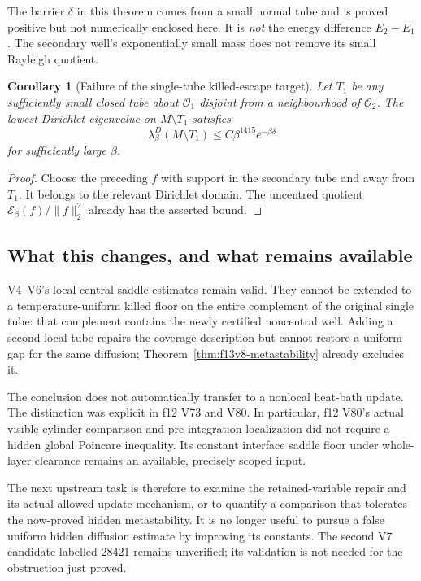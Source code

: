 \documentclass[11pt,oneside]{article}
\newtheorem{corollary}[theorem]{Corollary}
\newcommand{\E}{\mathcal E}
\begin{document}
The barrier \(\delta\) in this theorem
comes from a small normal tube and is
proved positive but not numerically
enclosed here. It is \emph{not} the
energy difference \(E_2-E_1\). The
secondary well's exponentially small
mass does not remove its small
Rayleigh quotient.

\begin{corollary}[Failure of the single-tube killed-escape target]
\label{cor:f13v8-killed}
Let \(T_1\) be any sufficiently small
closed tube about \(\mathcal O_1\)
disjoint from a neighbourhood of
\(\mathcal O_2\). The lowest Dirichlet
eigenvalue on \(M\setminus T_1\) satisfies
\[
 \lambda_\beta^D(M\setminus T_1)
 \le C\beta^{1415}e^{-\beta\delta}
\]
for sufficiently large \(\beta\).
\end{corollary}

\begin{proof}
Choose the preceding \(f\) with support
in the secondary tube and away from
\(T_1\). It belongs to the relevant
Dirichlet domain. The uncentred
quotient \(\E_\beta(f)/\|f\|_2^2\)
already has the asserted bound.
\end{proof}

\subsection{What this changes, and what remains available}

V4--V6's local central saddle estimates
remain valid. They cannot be extended
to a temperature-uniform killed floor
on the entire complement of the original
single tube: that complement contains
the newly certified noncentral well.
Adding a second local tube repairs
the coverage description but cannot
restore a uniform gap for the same
diffusion; Theorem~\ref{thm:f13v8-metastability}
already excludes it.

The conclusion does not automatically
transfer to a nonlocal heat-bath update.
The distinction was explicit in f12
V73 and V80. In particular, f12 V80's
actual visible-cylinder comparison
and pre-integration localization did
not require a hidden global Poincare
inequality. Its constant interface
saddle floor under whole-layer
clearance remains an available,
precisely scoped input.

The next upstream task is therefore
to examine the retained-variable
repair and its actual allowed update
mechanism, or to quantify a comparison
that tolerates the now-proved hidden
metastability. It is no longer useful
to pursue a false uniform hidden
diffusion estimate by improving its
constants. The second V7 candidate
labelled 28421 remains unverified;
its validation is not needed for
the obstruction just proved.
\end{document}

